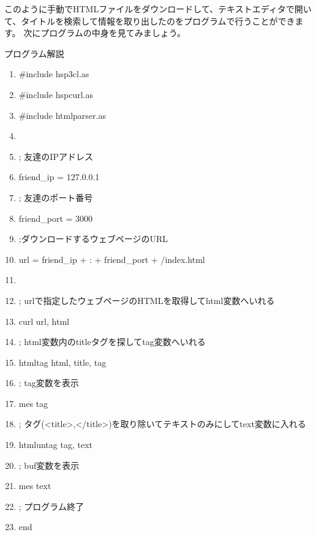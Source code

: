 \documentclass[a4paper,12pt,dvipdfmx]{jarticle}
\begin{document}
\bigskip


\bigskip

このように手動でHTMLファイルをダウンロードして、テキストエディタで開いて、タイトルを検索して情報を取り出したのをプログラムで行うことができます。
次にプログラムの中身を見てみましょう。

\clearpage
プログラム解説



\begin{center}
\begin{boxedminipage}{16.053cm}
\setlength{\itemsep}{0cm} %
\setlength{\parskip}{0cm} %
\begin{enumerate}
\baselineskip 10pt
\setlength{\itemsep}{0cm} %
\item \#include {\textquotedbl}hsp3cl.as{\textquotedbl}
\item \#include {\textquotedbl}hspcurl.as{\textquotedbl}
\item \#include {\textquotedbl}htmlparser.as{\textquotedbl}
\item 
\item ; 友達のIPアドレス
\item friend\_ip = {\textquotedbl}127.0.0.1{\textquotedbl}
\item ; 友達のポート番号 
\item friend\_port = 3000
\item ;ダウンロードするウェブページのURL
\item url = friend\_ip + {\textquotedbl}:{\textquotedbl} + friend\_port + {\textquotedbl}/index.html{\textquotedbl}
\item 
\item ;
urlで指定したウェブページのHTMLを取得してhtml変数へいれる
\item curl url, html
\item ;
html変数内のtitleタグを探してtag変数へいれる
\item htmltag html, {\textquotedbl}title{\textquotedbl}, tag
\item ; tag変数を表示
\item mes tag
\item ;
タグ({\textless}title{\textgreater},{\textless}/title{\textgreater})を取り除いてテキストのみにしてtext変数に入れる
\item htmluntag tag, text
\item ; buf変数を表示
\item mes text
\item ; プログラム終了
\item end
\end{enumerate}
\end{boxedminipage}
\end{center}
\end{document}
